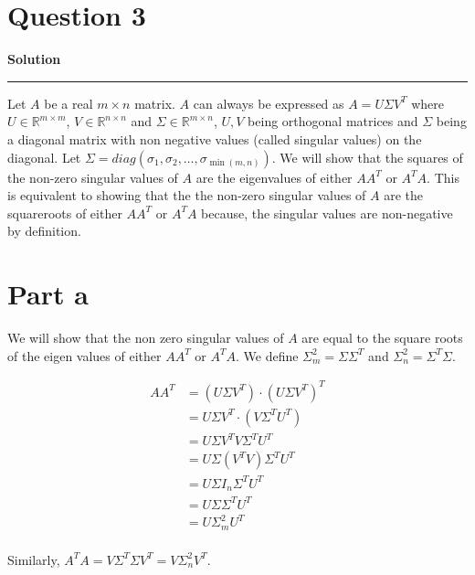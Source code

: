 \documentclass[a4paper,12pt]{article}
\title{\cooltitle{CS663 Assignment-4}}
\author{{\bf Saksham Rathi, Kavya Gupta, Shravan Srinivasa Raghavan} \\
\small Department of Computer Science, \\
Indian Institute of Technology Bombay \\}
\date{}
\newenvironment{solution}[2][]{%
    \begin{mdframed}[linecolor=blue!70!black, linewidth=2pt, roundcorner=10pt, backgroundcolor=yellow!10!white, skipabove=12pt, skipbelow=12pt]%
        \textbf{\large #2}
        \par\noindent\rule{\textwidth}{0.4pt}
}{
    \end{mdframed}
}
\begin{document}
\maketitle

\section*{Question 3}

\begin{solution}{Solution}
    Let $A$ be a real $m \times n$ matrix. $A$ can always be expressed as $A = U \Sigma V^{T}$ where 
    $U \in \mathbb{R}^{m \times m}$, $V \in \mathbb{R}^{n \times n}$ and $\Sigma \in \mathbb{R}^{m \times n}$, 
    $U,V$ being orthogonal matrices and $\Sigma$ being a diagonal matrix with non negative values (called singular values)
    on the diagonal. Let $\Sigma = diag(\sigma_{1},\sigma_{2}, \dots,\sigma_{\min(m,n)})$. We will show that the squares 
    of the non-zero singular values of $A$ are the eigenvalues of either $AA^{T}$ or $A^{T}A$. This is equivalent to 
    showing that the the non-zero singular values of $A$ are the squareroots of either $AA^{T}$ or $A^{T}A$ because,
    the singular values are non-negative by definition. 
    \section*{Part a}
      We will show that the non zero singular values of $A$ are equal to the square roots of the eigen values of either 
      $AA^{T}$ or $A^{T}A$. We define $\Sigma_{m}^{2} = \Sigma \Sigma^{T}$ and $\Sigma^{2}_{n} = \Sigma^{T} \Sigma$.

      \begin{align*}
        AA^{T} &= (U \Sigma V^{T}) \cdot {(U \Sigma V^{T})}^{T} \\
               &= U \Sigma V^{T} \cdot (V \Sigma^{T} U^{T}) \\
               &= U \Sigma V^{T} V \Sigma^{T} U^{T} \\
               &= U \Sigma (V^{T}V) \Sigma^{T} U^{T} \\ 
               &= U \Sigma I_{n} \Sigma ^{T} U^{T} \\
               &= U \Sigma \Sigma^{T} U^{T} \\
               &= U \Sigma^{2}_{m} U^{T} \\
      \end{align*}

      Similarly, $A^{T}A = V \Sigma^{T} \Sigma V^{T} = V \Sigma_{n}^{2} V^{T}$.


\end{solution}
\end{document}
